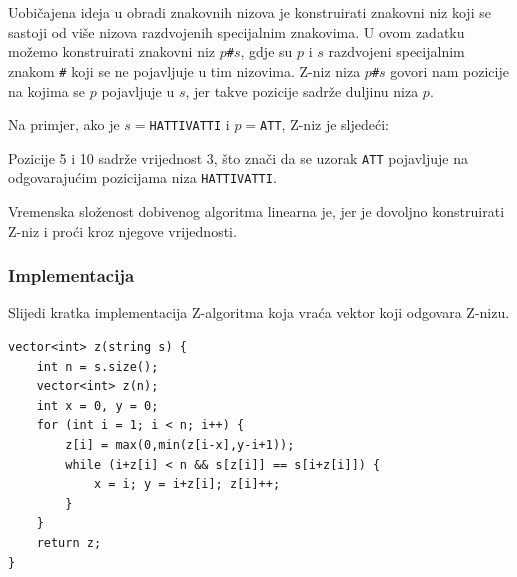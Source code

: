 Uobičajena ideja u obradi znakovnih nizova je
konstruirati znakovni niz koji se sastoji od
više nizova razdvojenih specijalnim znakovima.
U ovom zadatku možemo konstruirati znakovni niz
$p$\texttt{\#}$s$,
gdje su $p$ i $s$ razdvojeni specijalnim
znakom \texttt{\#} koji se ne pojavljuje
u tim nizovima.
Z-niz niza $p$\texttt{\#}$s$ govori nam pozicije
na kojima se $p$ pojavljuje u $s$,
jer takve pozicije sadrže duljinu niza $p$.

Na primjer, ako je $s=$\texttt{HATTIVATTI} i $p=$\texttt{ATT},
Z-niz je sljedeći:

\begin{center}
\end{center}

Pozicije 5 i 10 sadrže vrijednost 3,
što znači da se uzorak \texttt{ATT}
pojavljuje na odgovarajućim pozicijama
niza \texttt{HATTIVATTI}.

Vremenska složenost dobivenog algoritma
linearna je, jer je dovoljno konstruirati
Z-niz i proći kroz njegove vrijednosti.

\subsubsection{Implementacija}

Slijedi kratka implementacija Z-algoritma
koja vraća vektor koji odgovara Z-nizu.

\begin{lstlisting}
vector<int> z(string s) {
    int n = s.size();
    vector<int> z(n);
    int x = 0, y = 0;
    for (int i = 1; i < n; i++) {
        z[i] = max(0,min(z[i-x],y-i+1));
        while (i+z[i] < n && s[z[i]] == s[i+z[i]]) {
            x = i; y = i+z[i]; z[i]++;
        }
    }
    return z;
}
\end{lstlisting}